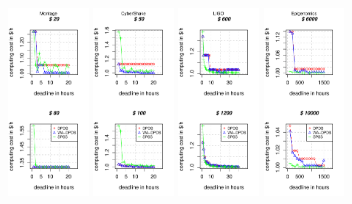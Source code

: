 \documentclass{sig-alternate}
\begin{document}
\begin{figure}[htb] 
\centering
\includegraphics[width=0.19\textwidth]{figures/pareto-cost-MONTAGE-n-1000-8-dagh1-20m0.pdf}
\includegraphics[width=0.19\textwidth]{figures/pareto-cost-CYBERSHAKE-n-1000-8-dagh1-20m0.pdf}
\includegraphics[width=0.19\textwidth]{figures/pareto-cost-LIGO-n-1000-8-dagh1-40m0.pdf}
\includegraphics[width=0.19\textwidth]{figures/pareto-cost-GENOME-n-1000-8-dagh100-1500m0.pdf}

\end{figure}
\end{document}

